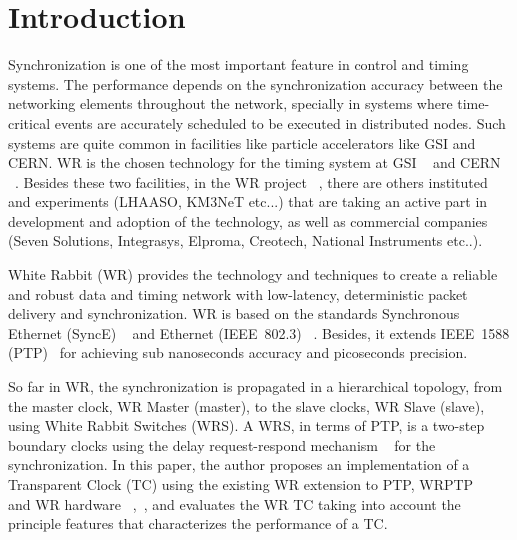 \section{Introduction}

Synchronization is one of the most important feature in control and timing
systems. The performance depends on the synchronization accuracy between 
the networking elements throughout the network, specially in systems 
where time-critical events are accurately scheduled to be executed in
distributed nodes. Such systems are quite common in facilities like particle 
accelerators like GSI and CERN. WR is the chosen technology for the timing system 
at GSI ~\cite{biblio:FAIRtimingSystem} and CERN ~\cite{biblio:cernWr}. 
Besides these two facilities, in the WR project ~\cite{biblio:wrproj}, there are others 
instituted and experiments (LHAASO, KM3NeT etc...) that are taking an active part in 
development and adoption of the technology, as well as commercial companies (Seven Solutions, 
Integrasys, Elproma, Creotech, National Instruments etc..).

White Rabbit (WR) provides the technology and techniques to create a 
reliable and robust data and timing network with low-latency, deterministic packet 
delivery and synchronization. WR is based on the standards Synchronous Ethernet 
(SyncE) ~\cite{biblio:synch} and  Ethernet (IEEE~802.3) ~\cite{biblio:ethernet}. Besides, it extends IEEE~1588 
(PTP)~\cite{biblio:ptp} for achieving sub nanoseconds  accuracy and picoseconds precision.

So far in WR, the synchronization is propagated in a hierarchical topology, from the master clock, 
WR Master (master), to the slave clocks, WR Slave (slave), using White Rabbit Switches (WRS). 
A WRS, in terms of PTP, is a two-step boundary clocks using the delay request-respond mechanism ~\cite{biblio:ptp}  
for the synchronization. In this paper, the author proposes an implementation
of a Transparent Clock (TC) using the existing WR extension to PTP, WRPTP ~\cite{biblio:wrptp} 
and WR hardware ~\cite{biblio:spec},~\cite{biblio:wrswitch}, and evaluates the
WR TC taking into account the principle features that characterizes the performance of a TC. 


